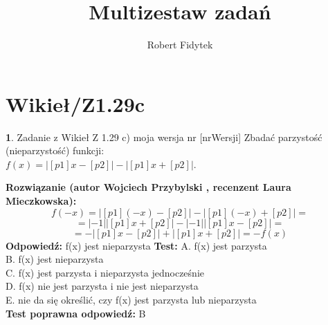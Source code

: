 \documentclass[12pt, a4paper]{article}
\title{Multizestaw zadań}
\author{Robert Fidytek}
\date{}
\theoremstyle{definition} %
\newtheorem{zad}{}
\newcommand{\kategoria}[1]{\section{#1}} %
\newcommand{\zadStart}[1]{\begin{zad}#1\newline} %
\newcommand{\zadStop}{\end{zad}}   %
\newcommand{\rozwStart}[2]{\noindent \textbf{Rozwiązanie (autor #1 , recenzent #2): }\newline} %
\newcommand{\rozwStop}{\newline}                                            %
\newcommand{\odpStart}{\noindent \textbf{Odpowiedź:}\newline}    %
\newcommand{\odpStop}{\newline}                                             %
\newcommand{\testStart}{\noindent \textbf{Test:}\newline} %
\newcommand{\testStop}{\newline} %
\newcommand{\kluczStart}{\noindent \textbf{Test poprawna odpowiedź:}\newline} %
\newcommand{\kluczStop}{\newline} %
\begin{document}
\maketitle


\kategoria{Wikieł/Z1.29c}
\zadStart{Zadanie z Wikieł Z 1.29 c) moja wersja nr [nrWersji]}
Zbadać parzystość (nieparzystość) funkcji:\\ $ f(x)=|[p1]x-[p2]|-|[p1]x+[p2]|$.
\zadStop
\rozwStart{Wojciech Przybylski}{Laura Mieczkowska}
$$f(-x)=|[p1](-x)-[p2]|-|[p1](-x)+[p2]|=$$
$$=|-1||[p1]x+[p2]|-|-1||[p1]x-[p2]|=$$
$$=-|[p1]x-[p2]|+|[p1]x+[p2]|=-f(x)$$
\rozwStop
\odpStart
f(x) jest nieparzysta
\odpStop
\testStart
A. f(x) jest parzysta\\
B. f(x) jest nieparzysta\\
C. f(x) jest parzysta i nieparzysta jednocześnie\\
D. f(x) nie jest parzysta i nie jest nieparzysta\\
E. nie da się określić, czy f(x) jest parzysta lub nieparzysta\\
\testStop
\kluczStart
B
\kluczStop
\end{document}
